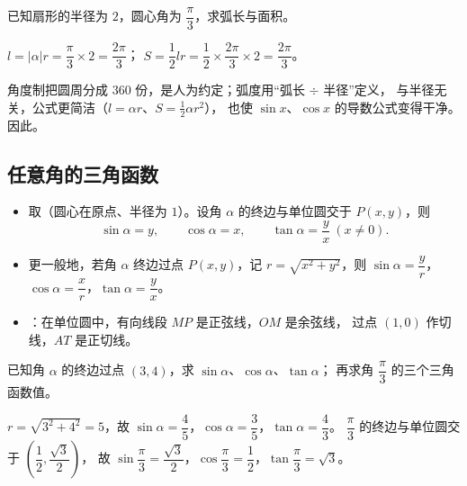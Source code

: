 \begin{explore}
\begin{problem}
已知扇形的半径为 $2$，圆心角为 $\dfrac{\pi}{3}$，求弧长与面积。
\end{problem}
\begin{solution}
$l=|\alpha|r=\dfrac{\pi}{3}\times2=\dfrac{2\pi}{3}$；
$S=\dfrac12lr=\dfrac12\times\dfrac{2\pi}{3}\times2=\dfrac{2\pi}{3}$。
\end{solution}

角度制把圆周分成 $360$ 份，是人为约定；弧度用“弧长 $\div$ 半径”定义，
与半径无关，公式更简洁（$l=\alpha r$、$S=\frac12\alpha r^2$），
也使 $\sin x$、$\cos x$ 的导数公式变得干净。因此。

\subsection{任意角的三角函数}

\begin{itemize}
  \item 取（圆心在原点、半径为 $1$）。设角 $\alpha$ 的终边与单位圆交于 $P(x,y)$，则
        \[
          \sin\alpha=y,\qquad \cos\alpha=x,\qquad \tan\alpha=\frac{y}{x}\ (x\neq0).
        \]
  \item 更一般地，若角 $\alpha$ 终边过点 $P(x,y)$，记 $r=\sqrt{x^2+y^2}$，则
        $\sin\alpha=\dfrac{y}{r}$，$\cos\alpha=\dfrac{x}{r}$，$\tan\alpha=\dfrac{y}{x}$。
  \item {}：在单位圆中，有向线段 $MP$ 是正弦线，$OM$ 是余弦线，
        过点 $(1,0)$ 作切线，$AT$ 是正切线。
\end{itemize}

\begin{example}
已知角 $\alpha$ 的终边过点 $(3,4)$，求 $\sin\alpha$、$\cos\alpha$、$\tan\alpha$；
再求角 $\dfrac{\pi}{3}$ 的三个三角函数值。
\end{example}
\begin{solution}
$r=\sqrt{3^2+4^2}=5$，故 $\sin\alpha=\dfrac45$，$\cos\alpha=\dfrac35$，$\tan\alpha=\dfrac43$。
$\dfrac{\pi}{3}$ 的终边与单位圆交于 $\left(\dfrac12,\dfrac{\sqrt3}{2}\right)$，
故 $\sin\dfrac{\pi}{3}=\dfrac{\sqrt3}{2}$，$\cos\dfrac{\pi}{3}=\dfrac12$，$\tan\dfrac{\pi}{3}=\sqrt3$。
\end{solution}


\end{explore}
